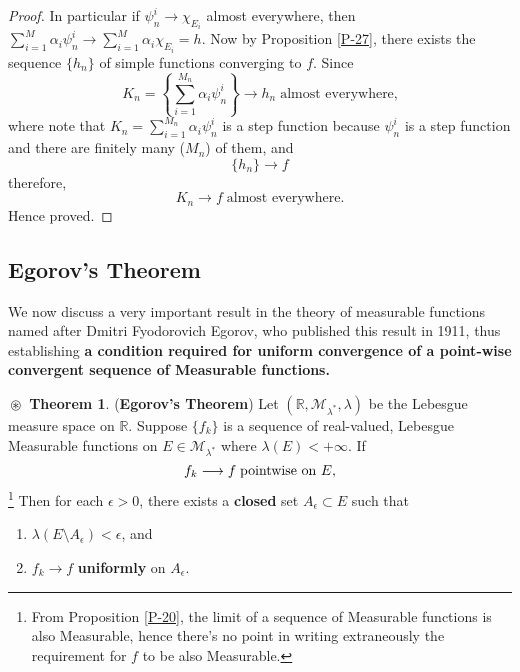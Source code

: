 \documentclass{article}
\theoremstyle{definition}
\newtheorem{theorem}{$\boxed{\boxed{\circledast}}$ Theorem}
\theoremstyle{remark}
\theoremstyle{definition}
\theoremstyle{definition}
\theoremstyle{definition}
\newcommand{\R}{\mathbb{R}}
\newcommand{\set}[1]{\mathscr{#1}}
\newcommand{\msigm}[1]{\set{M}_{#1}}
\newcommand{\lm}[1]{\lambda\left (#1\right )}
\begin{document}
\begin{proof}
In particular if $ \psi^{i}_{n} \longrightarrow \chi_{E_i} $ almost everywhere, then $ \sum_{i=1}^{M} \alpha_i \psi_n^{i} \longrightarrow \sum_{i=1}^{M}\alpha_i \chi_{E_i} = h$. Now by Proposition \ref{P-27}, there exists the sequence $ \{h_n\} $ of simple functions converging to $ f $. Since 
\[K_n = \left \{\sum_{i=1}^{M_n} \alpha_i \psi_n^i\right \} \longrightarrow h_n\;\text{almost everywhere,}\]
where note that $K_n = \sum_{i=1}^{M_n} \alpha_i \psi_n^i  $ is a step function because $ \psi_n^i $ is a step function and there are finitely many ($ M_n $) of them, and
\[\{h_n\}\longrightarrow f\]
therefore,
\[K_n \longrightarrow f\;\text{almost everywhere.}\]
Hence proved.
\end{proof}
\hrulefill
\subsection{Egorov's Theorem}
We now discuss a very important result in the theory of measurable functions named after Dmitri Fyodorovich Egorov, who published this result in 1911, thus establishing \textbf{a condition required for uniform convergence of a point-wise convergent sequence of Measurable functions.}
\begin{theorem} (\textbf{Egorov's Theorem})
	\label{T-3}
	Let $ (\R,\msigm{\lambda^*},\lambda) $ be the Lebesgue measure space on $ \R $. Suppose $ \{f_k\} $ is a sequence of real-valued, Lebesgue Measurable functions on $ E \in \msigm{\lambda^*} $ where $ \lm{E} < +\infty $. If 
	\[f_k \longrightarrow f\;\text{pointwise on $ E $,}\]\footnote{From Proposition \ref{P-20}, the limit of a sequence of Measurable functions is also Measurable, hence there's no point in writing extraneously the requirement for $ f $ to be also Measurable.}
	Then for each $ \epsilon > 0 $, there exists a \textbf{closed} set $ A_\epsilon \subset E$ such that
	\begin{enumerate}
		\item {$ \lm{E\setminus A_\epsilon} < \epsilon $, and}
		\item {$ f_k \longrightarrow f $ \textbf{uniformly} on $ A_\epsilon $.}
	\end{enumerate}
\end{theorem} 
\end{document}
